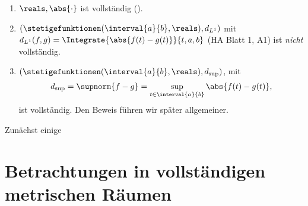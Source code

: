 \begin{beispiele}
    \begin{enumerate}
        
        \item \label{r_ist_vollstaendig} \( \reals ,\abs{\cdot} \) ist vollständig ().
        \item \label{integral_metrischer_raum_ist_nicht_vollstaendig} \( (\stetigefunktionen(\interval{a}{b} ,\reals), d_{L^1})\) mit \( d_{L^1}(f,g)=\Integrate{\abs{f(t)-g(t)}}{t,a,b}\) (\vgl HA Blatt 1, A1) ist \emph{nicht} vollständig. 
        \item \( (\stetigefunktionen(\interval{a}{b},\reals ), d_{\sup})\), mit
        \begin{align*}
            d_{\sup}=\supnorm{f-g}=\sup_{t\in \interval{a}{b}}\abs{f(t)-g(t)},
        \end{align*}
        ist vollständig.
        Den Beweis führen wir später allgemeiner.
    \end{enumerate}
    

\end{beispiele}
Zunächst einige 
\section{Betrachtungen in vollständigen metrischen Räumen}

